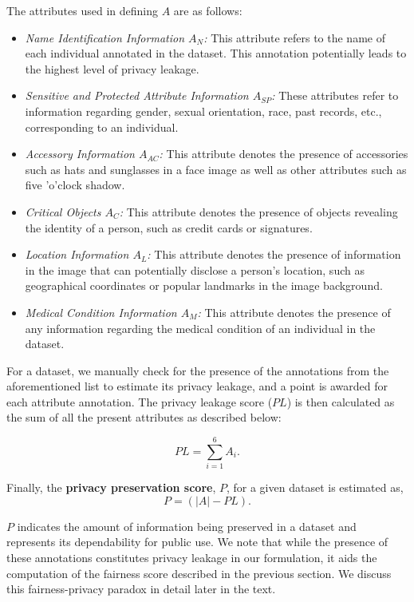 \documentclass[journal]{IEEEtran}
\begin{document}
The attributes used in defining $A$ are as follows:
\begin{itemize}
    \item \textit{Name Identification Information $A_N$:} This attribute refers to the name of each individual annotated in the dataset. This annotation potentially leads to the highest level of privacy leakage.
    \item \textit{Sensitive and Protected Attribute Information $A_{SP}$:} These attributes refer to information regarding gender, sexual orientation, race, past records, etc., corresponding to an individual.
    \item \textit{Accessory Information $A_{AC}$:} This attribute denotes the presence of accessories such as hats and sunglasses in a face image as well as other attributes such as five 'o'clock shadow. 
    \item \textit{Critical Objects $A_C$:} This attribute denotes the presence of objects revealing the identity of a person, such as credit cards or signatures.
    \item \textit{Location Information $A_L$:} This attribute denotes the presence of information in the image that can potentially disclose a person's location, such as geographical coordinates or popular landmarks in the image background.
    \item \textit{Medical Condition Information $A_M$:} This attribute denotes the presence of any information regarding the medical condition of an individual in the dataset.
\end{itemize}

For a dataset, we manually check for the presence of the annotations from the aforementioned list to estimate its privacy leakage, and a point is awarded for each attribute annotation. The privacy leakage score ($PL$) is then calculated as the sum of all the present attributes as described below:

\begin{equation}
    PL =\sum_{i=1}^{6} A_i.
\end{equation}

Finally, the \textbf{privacy preservation score}, $P$, for a given dataset is estimated as,
\begin{equation}
    P = (|A| - PL).
\end{equation}

$P$ indicates the amount of information being preserved in a dataset and represents its dependability for public use. We note that while the presence of these annotations constitutes privacy leakage in our formulation, it aids the computation of the fairness score described in the previous section. We discuss this fairness-privacy paradox in detail later in the text.
\end{document}
